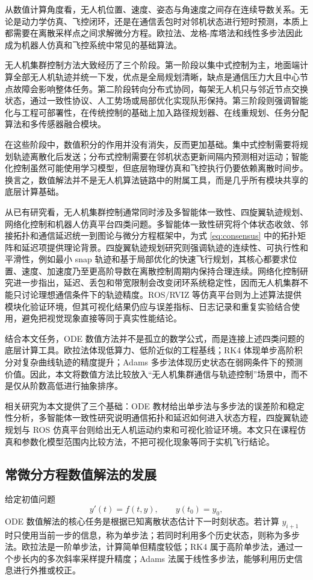 \documentclass[UTF8,zihao=-4]{ctexart}
\begin{document}
从数值计算角度看，无人机位置、速度、姿态与角速度之间存在连续导数关系。无论是动力学仿真、飞控闭环，还是在通信丢包时对邻机状态进行短时预测，本质上都需要在离散采样点之间求解微分方程。欧拉法、龙格-库塔法和线性多步法因此成为机器人仿真和飞控系统中常见的基础算法。

无人机集群控制方法大致经历了三个阶段。第一阶段以集中式控制为主，地面端计算全部无人机轨迹并统一下发，优点是全局规划清晰，缺点是通信压力大且中心节点故障会影响整体任务。第二阶段转向分布式协同，每架无人机只与邻近节点交换状态，通过一致性协议、人工势场或局部优化实现队形保持。第三阶段则强调智能化与工程可部署性，在传统控制的基础上加入路径规划器、在线重规划、任务分配算法和多传感器融合模块。

在这些阶段中，数值积分的作用并没有消失，反而更加基础。集中式控制需要将规划轨迹离散化后发送；分布式控制需要在邻机状态更新间隔内预测相对运动；智能化控制虽然可能使用学习模型，但底层物理仿真和飞控执行仍要依赖离散时间步。换言之，数值解法并不是无人机算法链路中的附属工具，而是几乎所有模块共享的底层计算基础。

从已有研究看，无人机集群控制通常同时涉及多智能体一致性、四旋翼轨迹规划、网络化控制和机器人仿真平台四类问题。多智能体一致性研究将个体状态收敛、邻接拓扑和通信延迟统一到图论与微分方程框架中，为式 \eqref{eq:consensus} 中的拓扑矩阵和延迟项提供理论背景。四旋翼轨迹规划研究则强调轨迹的连续性、可执行性和平滑性，例如最小 snap 轨迹和基于局部优化的快速飞行规划，其核心都要求位置、速度、加速度乃至更高阶导数在离散控制周期内保持合理连续。网络化控制研究进一步指出，延迟、丢包和带宽限制会改变闭环系统稳定性，因而无人机集群不能只讨论理想通信条件下的轨迹精度。ROS/RVIZ 等仿真平台则为上述算法提供模块化验证环境，但其可视化结果仍应与误差指标、日志记录和重复实验结合使用，避免把视觉现象直接等同于真实性能结论。

结合本文任务，ODE 数值方法并不是孤立的数学公式，而是连接上述四类问题的底层计算工具。欧拉法体现低算力、低阶近似的工程基线；RK4 体现单步高阶积分对复杂曲线轨迹的精度提升；Adams 多步法体现历史状态在弱网条件下的预测价值。因此，本文将数值方法比较放入“无人机集群通信与轨迹控制”场景中，而不是仅从阶数高低进行抽象排序。

相关研究为本文提供了三个基础：ODE 教材给出单步法与多步法的误差阶和稳定性分析，多智能体一致性研究说明通信拓扑和延迟如何进入状态方程，四旋翼轨迹规划与 ROS 仿真平台则给出无人机运动约束和可视化验证环境。本文只在课程仿真和参数化模型范围内比较方法，不把可视化现象等同于实机飞行结论。

\subsection{常微分方程数值解法的发展}
给定初值问题
\begin{equation}
  y'(t)=f(t,y), \qquad y(t_0)=y_0,
  \label{eq:ivp}
\end{equation}
ODE 数值解法的核心任务是根据已知离散状态估计下一时刻状态。若计算 $y_{i+1}$ 时只使用当前一步的信息，称为单步法；若同时利用多个历史状态，则称为多步法。欧拉法是一阶单步法，计算简单但精度较低；RK4 属于高阶单步法，通过一个步长内的多次斜率采样提升精度；Adams 法属于线性多步法，能够利用历史信息进行外推或校正。
\end{document}
